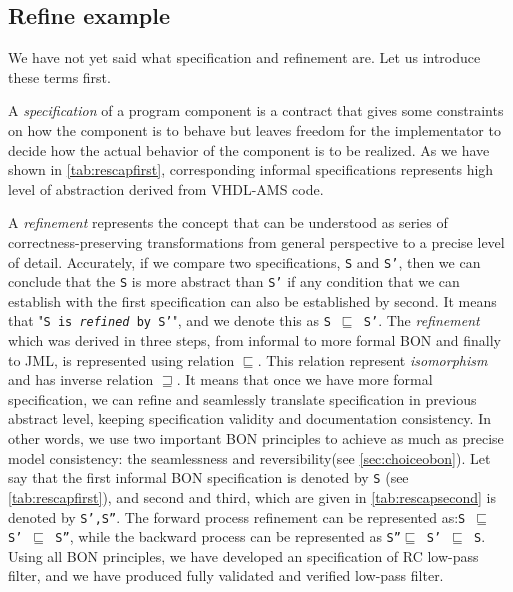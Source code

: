 \documentclass{article}
\begin{document}
\subsection{Refine example }
\label{subsec:refine}     
We have not yet said what specification and refinement are.  Let us
introduce these terms first.

A \emph{specification} of a program component is a contract that gives
some constraints on how the component is to behave but leaves freedom
for the implementator to decide how the actual behavior of the
component is to be realized.  As we have shown in
\autoref{tab:rescapfirst}, corresponding informal specifications
represents high level of abstraction derived from VHDL-AMS code.

A \emph{refinement} represents the concept that can be understood as
series of correctness-preserving transformations from general
perspective to a precise level of detail. Accurately, if we compare
two specifications, \texttt{S} and \texttt{S'}, then we can conclude
that the \texttt{S} is more abstract than \texttt{S'} if any condition
that we can establish with the first specification can also be
established by second.  It means that "\texttt{S is \emph{refined} by
S'}", and we denote this as \texttt{S $\sqsubseteq$ S'}.  The
\emph{refinement} which was derived in three steps, from informal to
more formal BON and finally to JML, is represented using relation
\texttt{$\sqsubseteq$}. This relation represent \emph{isomorphism} and
has inverse relation \texttt{$\sqsupseteq$}.  It means that once we
have more formal specification, we can refine and seamlessly translate
specification in previous abstract level, keeping specification
validity and documentation consistency.  In other words, we use two
important BON principles to achieve as much as precise model
consistency: the seamlessness and reversibility(see
\autoref{sec:choiceobon}).  Let say that the first informal BON
specification is denoted by \texttt{S} (see
\autoref{tab:rescapfirst}), and second and third, which are given in
\autoref{tab:rescapsecond} is denoted by \texttt{S',S''}.  The forward
process refinement can be represented as:\xspace \texttt{S
$\sqsubseteq$ S' $\sqsubseteq$ S''}, while the backward process can be
represented as \xspace \texttt{S''$\sqsubseteq$ S' $\sqsubseteq$ S}.
Using all BON principles, we have developed an specification of RC
low-pass filter, and we have produced fully validated and verified
low-pass filter.   

\end{document}
